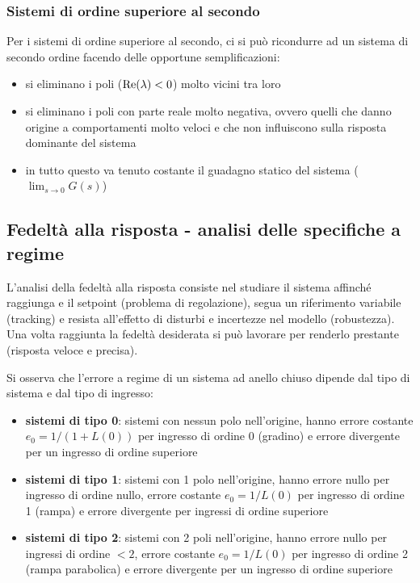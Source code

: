 \subsubsection*{Sistemi di ordine superiore al secondo}
Per i sistemi di ordine superiore al secondo, ci si può ricondurre ad un sistema di secondo ordine facendo delle opportune semplificazioni:
\begin{itemize}
	\item si eliminano i poli (\(\text{Re}(\lambda) < 0\)) molto vicini tra loro
	\item si eliminano i poli con parte reale molto negativa, ovvero quelli che danno origine a comportamenti molto veloci e che non
	influiscono sulla risposta dominante del sistema
	\item in tutto questo va tenuto costante il guadagno statico del sistema (\(\lim_{s \to 0} G(s)\))
\end{itemize}

\subsection{Fedeltà alla risposta - analisi delle specifiche a regime}
L'analisi della fedeltà alla risposta consiste nel studiare il sistema affinché raggiunga e il setpoint (problema di regolazione),
segua un riferimento variabile (tracking) e resista all’effetto di disturbi e incertezze nel modello (robustezza). Una volta raggiunta
la fedeltà desiderata si può lavorare per renderlo prestante (risposta veloce e precisa).

Si osserva che l'errore a regime di un sistema ad anello chiuso dipende dal tipo di sistema e dal tipo di ingresso:
\begin{itemize}
	\item \textbf{sistemi di tipo 0}: sistemi con nessun polo nell'origine, hanno errore costante \(e_0 = 1/(1+L(0))\) per ingresso
	di ordine 0 (gradino) e errore divergente per un ingresso di ordine superiore
	\item \textbf{sistemi di tipo 1}: sistemi con 1 polo nell'origine, hanno errore nullo per ingresso di ordine nullo, errore
	costante \(e_0 = 1/L(0)\) per ingresso di ordine 1 (rampa) e errore divergente per ingressi di ordine superiore
	\item \textbf{sistemi di tipo 2}: sistemi con 2 poli nell'origine, hanno errore nullo per ingressi di ordine \(<2\), errore
	costante \(e_0 = 1/L(0)\) per ingresso di ordine 2 (rampa parabolica) e errore divergente per un ingresso di ordine superiore
\end{itemize}


